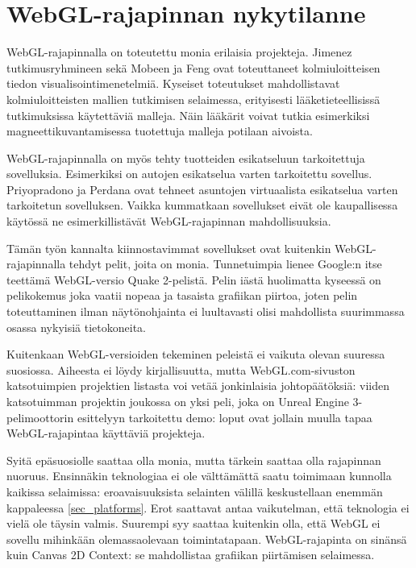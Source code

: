 \section{WebGL-rajapinnan nykytilanne}
\label{sec:sovelluksia}

\mbox{WebGL-rajapinnalla} on toteutettu monia erilaisia projekteja. Jimenez tutkimusryhmineen\cite{biomed} sekä Mobeen ja Feng\cite{volumerendering} ovat toteuttaneet kolmiuloitteisen tiedon visualisointimenetelmiä. Kyseiset toteutukset mahdollistavat kolmiuloitteisten mallien tutkimisen selaimessa, erityisesti lääketieteellisissä tutkimuksissa käytettäviä malleja. Näin lääkärit voivat tutkia esimerkiksi magneettikuvantamisessa tuotettuja malleja potilaan aivoista.

WebGL-rajapinnalla on myös tehty tuotteiden esikatseluun tarkoitettuja sovelluksia. Esimerkiksi \cite{3dcar} on autojen esikatselua varten tarkoitettu sovellus. Priyopradono ja Perdana\cite{housepreview} ovat tehneet asuntojen virtuaalista esikatselua varten tarkoitetun sovelluksen. Vaikka kummatkaan sovellukset eivät ole kaupallisessa käytössä ne esimerkillistävät WebGL-rajapinnan mahdollisuuksia.

Tämän työn kannalta kiinnostavimmat sovellukset ovat kuitenkin WebGL-rajapinnalla tehdyt pelit, joita on monia\cite{webglgames}. Tunnetuimpia lienee Google:n itse teettämä WebGL-versio Quake 2-pelistä\cite{quakewebgl}. Pelin iästä huolimatta kyseessä on pelikokemus joka vaatii nopeaa ja tasaista grafiikan piirtoa, joten pelin toteuttaminen ilman näytönohjainta ei luultavasti olisi mahdollista suurimmassa osassa nykyisiä tietokoneita. 

Kuitenkaan WebGL-versioiden tekeminen peleistä ei vaikuta olevan suuressa suosiossa. Aiheesta ei löydy kirjallisuutta, mutta WebGL.com-sivuston katsotuimpien projektien listasta\cite{webglgames} voi vetää jonkinlaisia johtopäätöksiä: viiden katsotuimman projektin joukossa on yksi peli, joka on Unreal Engine 3-pelimoottorin esittelyyn tarkoitettu demo\cite{epicwebgl}: loput ovat jollain muulla tapaa WebGL-rajapintaa käyttäviä projekteja.

Syitä epäsuosiolle saattaa olla monia, mutta tärkein saattaa olla rajapinnan nuoruus. Ensinnäkin teknologiaa ei ole välttämättä saatu toimimaan kunnolla kaikissa selaimissa: eroavaisuuksista selainten välillä keskustellaan enemmän kappaleessa \ref{sec_platforms}. Erot saattavat antaa vaikutelman, että teknologia ei vielä ole täysin valmis. Suurempi syy saattaa kuitenkin olla, että WebGL ei sovellu mihinkään olemassaolevaan toimintatapaan. WebGL-rajapinta on sinänsä kuin Canvas 2D Context: se mahdollistaa grafiikan piirtämisen selaimessa. 

